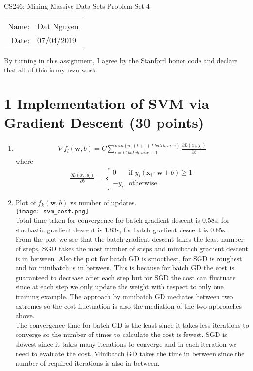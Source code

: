 \documentclass[12pt]{article}
\begin{document}
\begin{center}
{\Large CS246: Mining Massive Data Sets Problem Set 4}

\begin{tabular}{rl}     
Name: & Dat Nguyen \\
Date: & 07/04/2019
\end{tabular}
\end{center}
 
 By turning in this assignment, I agree by the Stanford honor code and declare that all of this is my own work.

\section*{1 Implementation of SVM via Gradient Descent (30 points)}
\begin{enumerate}[label=(\alph*)]
	\item	
	\begin{align*}
		\nabla f_l(\mathbf{w}, b) = C \sum_{i=l*batch\_size+1}^{min(n, (l+1)*batch\_size)} \frac{\partial L(x_i, y_i)}{\partial b}
	\end{align*}
	where
	\begin{align*}
		\frac{\partial L(x_i, y_i)}{\partial b} = 
		\begin{cases}
			0 &\text{if }y_i(\mathbf{x}_i\cdot\mathbf{w} + b) \geq 1 \\
			-y_i &\text{otherwise}
		\end{cases}
	\end{align*}
	\item
	Plot of $f_k(\mathbf{w},b)$ vs number of updates.\\
	\texttt{[image: svm\_cost.png]}\\
	Total time taken for convergence for batch gradient descent is 0.58s, for stochastic gradient descent is 1.83s, for batch gradient descent is 0.85s.\\
	From the plot we see that the batch gradient descent takes the least number of steps, SGD takes the most number of steps and minibatch gradient descent is in between. Also the plot for batch GD is smoothest, for SGD is roughest and for minibatch is in between. This is because for batch GD the cost is guaranteed to decrease after each step but for SGD the cost can fluctuate since at each step we only update the weight with respect to only one training example. The approach by minibatch GD mediates between two extremes so the cost fluctuation is also the mediation of the two approaches above.\\
	The convergence time for batch GD is the least since it takes less iterations to converge so the number of times to calculate the cost is fewest. SGD is slowest since it takes many iterations to converge and in each iteration we need to evaluate the cost. Minibatch GD takes the time in between since the number of required iterations is also in between.
\end{enumerate}
\end{document}
